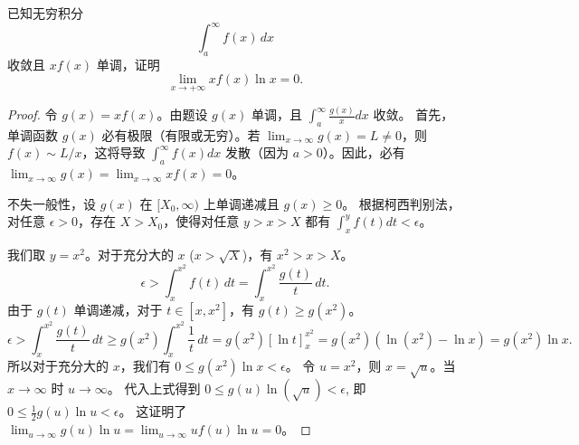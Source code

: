 \documentclass[lang=cn,10pt,thmcnt=section]{elegantbook}
\begin{document}
\begin{example}
    已知无穷积分 
\[
\int_{a}^{\infty} f(x) \, dx
\] 
收敛且 \( xf(x) \) 单调，证明 
\[
\lim_{x \to +\infty} xf(x)\ln x = 0.
\]
\end{example}
\begin{proof}
    令 $g(x)=xf(x)$。由题设 $g(x)$ 单调，且 $\int_a^\infty \frac{g(x)}{x}dx$ 收敛。
    首先，单调函数 $g(x)$ 必有极限（有限或无穷）。若 $\lim_{x\to\infty} g(x) = L \neq 0$，则 $f(x) \sim L/x$，这将导致 $\int_a^\infty f(x)dx$ 发散（因为 $a>0$）。因此，必有 $\lim_{x\to\infty} g(x) = \lim_{x\to\infty} xf(x) = 0$。
    
    不失一般性，设 $g(x)$ 在 $[X_0, \infty)$ 上单调递减且 $g(x) \ge 0$。
    根据柯西判别法，对任意 $\epsilon > 0$，存在 $X > X_0$，使得对任意 $y > x > X$ 都有 $\int_x^y f(t) dt < \epsilon$。
    
    我们取 $y = x^2$。对于充分大的 $x$ ($x > \sqrt{X}$)，有 $x^2 > x > X$。
    \[
    \epsilon > \int_x^{x^2} f(t) \, dt = \int_x^{x^2} \frac{g(t)}{t} \, dt.
    \]
    由于 $g(t)$ 单调递减，对于 $t \in [x, x^2]$，有 $g(t) \ge g(x^2)$。
    \[
    \epsilon > \int_x^{x^2} \frac{g(t)}{t} \, dt \ge g(x^2) \int_x^{x^2} \frac{1}{t} \, dt = g(x^2) [\ln t]_x^{x^2} = g(x^2) (\ln(x^2) - \ln x) = g(x^2) \ln x.
    \]
    所以对于充分大的 $x$，我们有 $0 \le g(x^2) \ln x < \epsilon$。
    令 $u = x^2$，则 $x = \sqrt{u}$。当 $x \to \infty$ 时 $u \to \infty$。
    代入上式得到 $0 \le g(u) \ln(\sqrt{u}) < \epsilon$, 即 $0 \le \frac{1}{2} g(u) \ln u < \epsilon$。
    这证明了 $\lim_{u \to \infty} g(u) \ln u = \lim_{u \to \infty} u f(u) \ln u = 0$。
\end{proof}
\end{document}
